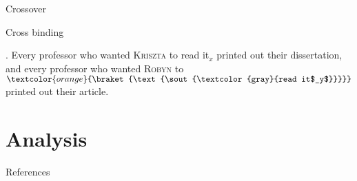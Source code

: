 \documentclass{beamer}
\newcommand{\elide}[1]{\ensuremath{\textcolor{orange}{\braket{\text{\sout{\textcolor{gray}{#1}}}}}}}
\begin{document}
\begin{frame}{Crossover}


\end{frame}

\begin{frame}{Cross binding}

\ex. Every professor who wanted \textsc{Kriszta} to read it$_x$ printed out their dissertation, and
every professor who wanted \textsc{Robyn} to \elide{read it$_y$} printed out their article.

\end{frame}


\section{Analysis}



\begin{frame}[allowframebreaks]{References}

  \printbibliography[heading=none]

\end{frame}
\end{document}
